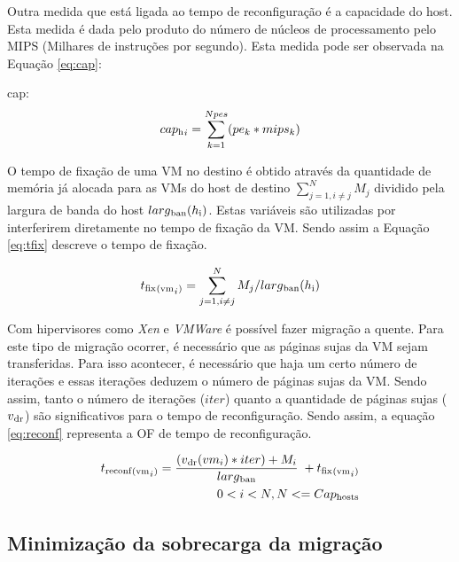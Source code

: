 Outra medida que está ligada ao tempo de reconfiguração é a capacidade do host. Esta 
medida é dada pelo produto do número de núcleos de processamento pelo MIPS (Milhares de
instruções por segundo). Esta medida pode ser observada na Equação \ref{eq:cap}:

cap:
\begin{equation}
\begin{split}
cap\textsubscript{h}_i = \sum_{k=1}^{Npes}(pe_k * mips_k)
\end{split}
\label{eq:cap}
\end{equation}

O tempo de fixação de uma VM no destino é obtido através da quantidade de memória 
já alocada para as VMs do host de destino $\sum_{j=1,i \neq j}^{N} M_j$ dividido pela
largura de banda do host $larg\textsubscript{ban}({h}\textsubscript{i})$. Estas variáveis 
são utilizadas por interferirem diretamente no tempo de fixação da VM.
Sendo assim a Equação \ref{eq:tfix} descreve o tempo de fixação.

\begin{equation}
t\textsubscript{fix}\textsubscript{(vm}_i\textsubscript{)} = \sum_{j=1,i \neq j}^{N} M_j/larg\textsubscript{ban}({h}\textsubscript{i})
\label{eq:tfix} 
\end{equation}

Com hipervisores como \textit{Xen} e \textit{VMWare} é possível fazer migração a quente.
Para este tipo de migração ocorrer, é necessário que as páginas sujas da VM sejam transferidas.
Para isso acontecer, é necessário que haja um certo número de iterações e essas iterações deduzem
o número de páginas sujas da VM. Sendo assim, tanto o número de iterações ($ iter $)
quanto a quantidade de páginas sujas ($ v\textsubscript{dr} $) são significativos para 
o tempo de reconfiguração. Sendo assim, a equação \ref{eq:reconf} representa a OF 
de tempo de reconfiguração.

\begin{equation}
\begin{split}
t\textsubscript{reconf}\textsubscript{(vm}_i\textsubscript{)} = \dfrac{ (v\textsubscript{dr}(vm_i) * iter) + M_i}{larg\textsubscript{ban}} \; + t\textsubscript{fix}\textsubscript{(vm}_i\textsubscript{)} \\
0<i<N, N <= Cap\textsubscript{hosts}
\end{split}
\label{eq:reconf}
\end{equation}

\subsection{Minimização da sobrecarga da migração}

